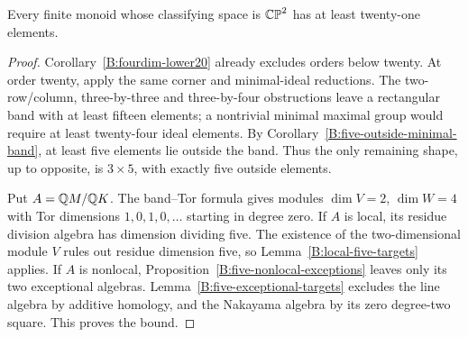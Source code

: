 \begin{corollary}\label{B:CP2-lower21}
Every finite monoid whose classifying space is $\mathbb {CP}^2$ has at
least twenty-one elements.
\end{corollary}
\begin{proof}
Corollary~\ref{B:fourdim-lower20} already excludes orders below
twenty.  At order twenty, apply the same corner and minimal-ideal
reductions.  The two-row/column, three-by-three and three-by-four
obstructions leave a rectangular band with at least fifteen
elements; a nontrivial minimal maximal group would require at
least twenty-four ideal elements.  By
Corollary~\ref{B:five-outside-minimal-band}, at least five elements
lie outside the band.  Thus the only remaining shape, up to
opposite, is $3\times5$, with exactly five outside elements.

Put $A=\mathbb Q M/\mathbb Q K$.  The band--Tor formula gives modules
$\dim V=2$, $\dim W=4$ with Tor dimensions $1,0,1,0,\ldots$
starting in degree zero.  If $A$ is local, its residue division
algebra has dimension dividing five.  The existence of the
two-dimensional module $V$ rules out residue dimension five,
so Lemma~\ref{B:local-five-targets} applies.  If $A$ is nonlocal,
Proposition~\ref{B:five-nonlocal-exceptions} leaves only its two
exceptional algebras.  Lemma~\ref{B:five-exceptional-targets}
excludes the line algebra by additive homology, and the Nakayama
algebra by its zero degree-two square.  This proves the bound.
\end{proof}
